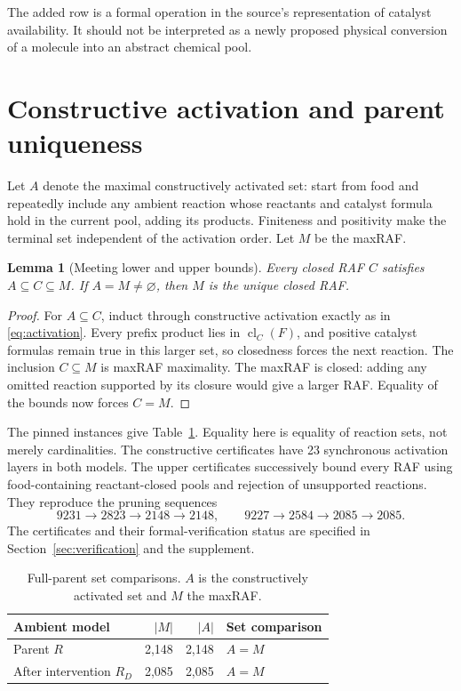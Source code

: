 \documentclass[11pt]{article}
\newtheorem{lemma}[theorem]{Lemma}
\theoremstyle{definition}\newtheorem{definition}[theorem]{Definition}
\newcommand{\cl}{\operatorname{cl}}
\begin{document}
The added row is a formal operation in the source's representation of catalyst availability. It should not be interpreted as a newly proposed physical conversion of a molecule into an abstract chemical pool.

\section{Constructive activation and parent uniqueness}
Let $A$ denote the maximal constructively activated set: start from food and repeatedly include any ambient reaction whose reactants and catalyst formula hold in the current pool, adding its products. Finiteness and positivity make the terminal set independent of the activation order. Let $M$ be the maxRAF.

\begin{lemma}[Meeting lower and upper bounds]\label{lem:unique}
Every closed RAF $C$ satisfies $A\subseteq C\subseteq M$. If $A=M\ne\varnothing$, then $M$ is the unique closed RAF.
\end{lemma}
\begin{proof}
For $A\subseteq C$, induct through constructive activation exactly as in \eqref{eq:activation}. Every prefix product lies in $\cl_C(F)$, and positive catalyst formulas remain true in this larger set, so closedness forces the next reaction. The inclusion $C\subseteq M$ is maxRAF maximality. The maxRAF is closed: adding any omitted reaction supported by its closure would give a larger RAF. Equality of the bounds now forces $C=M$.
\end{proof}

The pinned instances give Table~\ref{tab:parent}. Equality here is equality of reaction sets, not merely cardinalities. The constructive certificates have 23 synchronous activation layers in both models. The upper certificates successively bound every RAF using food-containing reactant-closed pools and rejection of unsupported reactions. They reproduce the pruning sequences
\[
9231\longrightarrow2823\longrightarrow2148\longrightarrow2148,
\qquad
9227\longrightarrow2584\longrightarrow2085\longrightarrow2085.
\]
The certificates and their formal-verification status are specified in Section~\ref{sec:verification} and the supplement.

\begin{table}[tb]\centering
\caption{Full-parent set comparisons. $A$ is the constructively activated set and $M$ the maxRAF.}\label{tab:parent}
\begin{tabular}{lrrl}\toprule
Ambient model & $|M|$ & $|A|$ & Set comparison\\\midrule
Parent $R$ & 2,148 & 2,148 & $A=M$\\
After intervention $R_D$ & 2,085 & 2,085 & $A=M$\\\bottomrule
\end{tabular}\end{table}
\end{document}
